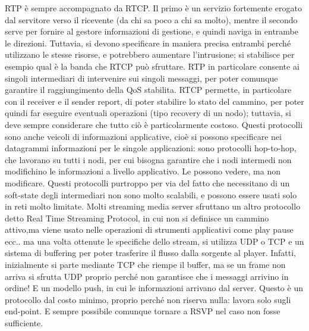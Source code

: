 RTP è sempre accompagnato da RTCP. Il primo è un servizio fortemente erogato dal servitore verso il ricevente (da chi
sa poco a chi sa molto), mentre il secondo serve per fornire al gestore informazioni di gestione, e quindi naviga
in entrambe le direzioni. Tuttavia, si devono specificare in maniera precisa entrambi perché utilizzano le stesse
risorse, e potrebbero aumentare l'intrusione; si stabilisce per esempio qual è la banda che RTCP può sfruttare.
RTP in particolare consente ai singoli intermediari di intervenire sui singoli messaggi, per poter comunque garantire
il raggiungimento della QoS stabilita. RTCP permette, in particolare con il receiver e il sender report, di poter
stabilire lo stato del cammino, per poter quindi far eseguire eventuali operazioni (tipo recovery di un nodo);
tuttavia, si deve sempre considerare che tutto ciò è particolarmente costoso.
Questi protocolli sono anche veicoli di informazioni applicative, cioè si possono specificare nei datagrammi
informazioni per le singole applicazioni: sono protocolli hop-to-hop, che lavorano su tutti i nodi, per cui bisogna
garantire che i nodi intermedi non modifichino le informazioni a livello applicativo. Le possono vedere, ma non
modificare.
Questi protocolli purtroppo per via del fatto che necessitano di un soft-state degli intermediari non sono molto scalabili, e possono essere usati solo in reti molto limitate. Molti streaming media server sfruttano un altro protocollo detto Real Time Streaming Protocol, in cui non si definisce un cammino attivo,ma viene usato nelle operazioni di strumenti applicativi come play pause ecc.. ma una volta ottenute le specifiche dello stream, si utilizza UDP o TCP e un sistema di buffering per poter trasferire il flusso dalla sorgente al player. Infatti, inizialmente si parte mediante TCP che riempe il buffer, ma se un frame non arriva si sfrutta UDP proprio perché non garantisce che i messaggi arrivino in ordine! E un modello push, in cui le informazioni arrivano dal server. Questo è un protocollo dal costo minimo, proprio perché non riserva nulla: lavora solo sugli end-point. E sempre possibile comunque tornare a RSVP nel caso non fosse sufficiente.
